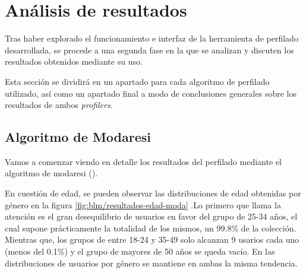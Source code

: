 \section{Análisis de resultados}

Tras haber explorado el funcionamiento e interfaz de la herramienta de perfilado desarrollada, se procede a una segunda fase en la que se analizan y discuten los resultados obtenidos mediante su uso.

Esta sección se dividirá en un apartado para cada algoritmo de perfilado utilizado, así como un apartado final a modo de conclusiones generales sobre los resultados de ambos \textit{profilers}.

\subsection{Algoritmo de Modaresi}
Vamos a comenzar viendo en detalle los resultados del perfilado mediante el algoritmo de modaresi (\cite{modaresi:2016}).

En cuestión de edad, se pueden observar las distribuciones de edad obtenidas  por género en la figura \ref{fig:blm/resultados-edad-moda} .Lo primero que 
llama la atención es el gran desequilibrio de usuarios en favor del grupo de 25-34 años, el cual supone prácticamente la totalidad de los mismos, un 99.8\% de la colección. Mientras que, los grupos de entre 18-24 y 35-49 solo alcanzan 9 usarios cada uno (menos del 0.1\%) y el grupo de mayores de 50 años se queda vacío. En las distribuciones de usuarios por género se mantiene en ambas la misma tendencia.

